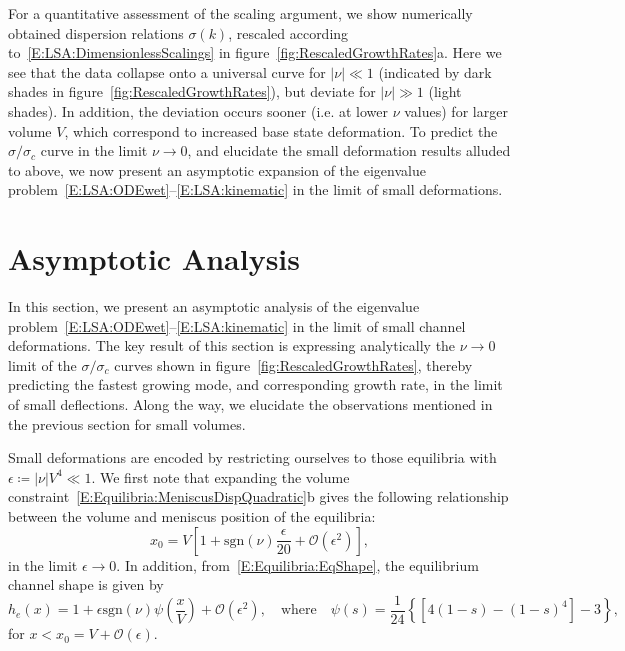 \documentclass{jfm}
\newcommand{\order}[1]{\mathcal{O}\left(#1\right)}
\begin{document}
For a quantitative assessment of the scaling argument, we show numerically obtained dispersion relations $\sigma(k)$, rescaled according to~\eqref{E:LSA:DimensionlessScalings} in figure~\ref{fig:RescaledGrowthRates}a. Here we see that the data collapse onto a universal curve for $|\nu| \ll 1$ (indicated by dark shades in figure~\ref{fig:RescaledGrowthRates}), but deviate for $|\nu|\gg 1$ (light shades). In addition, the deviation occurs sooner (i.e. at lower $\nu$ values) for larger volume $V$, which correspond to increased base state deformation. To predict the $\sigma/\sigma_c$ curve in the limit $\nu \to 0$, and elucidate the small deformation results alluded to above, we now present an asymptotic expansion of the eigenvalue problem~\eqref{E:LSA:ODEwet}--\eqref{E:LSA:kinematic} in the limit of small deformations.


\section{Asymptotic Analysis}\label{S:Asymptotics}
\newcommand{\param}{\delta} %
In this section, we present an asymptotic analysis of the eigenvalue problem~\eqref{E:LSA:ODEwet}--\eqref{E:LSA:kinematic}  in the limit of small channel deformations. The key result of this section is expressing analytically the $\nu \to 0$ limit of the $\sigma/\sigma_c$ curves shown in figure~\ref{fig:RescaledGrowthRates}, thereby predicting the fastest growing mode, and corresponding growth rate, in the limit of small deflections. Along the way, we elucidate the observations mentioned in the previous section for small volumes.

Small deformations are encoded by restricting ourselves to those equilibria with $\epsilon  \coloneqq |\nu| V^4 \ll 1$. We first note that expanding the volume constraint~\eqref{E:Equilibria:MeniscusDispQuadratic}b gives the following relationship between the volume and meniscus position of the  equilibria:
\begin{equation}\label{E:Asymptotics:EqMeniscusPositionExpansion}
    x_0 = V\left[1 + \mathrm{sgn}(\nu) \frac{\epsilon}{20} + \order{\epsilon^2}\right],
\end{equation}
in the limit $\epsilon \to 0$. In addition, from~\eqref{E:Equilibria:EqShape}, the equilibrium channel shape is given by
\begin{equation}\label{E:Asymptotics:EqChannelShapeExpansion}
    h_e(x) = 1 + \epsilon \mathrm{sgn}(\nu)\psi\left(\frac{x}{V}\right) + \order{\epsilon^2}, \quad \text{where} \quad \psi(s) = \frac{1}{24}\left\{\left[4(1-s) - (1-s)^4\right]-3\right\},
\end{equation}
for $x < x_0 = V + \order{\epsilon}$.
\end{document}

